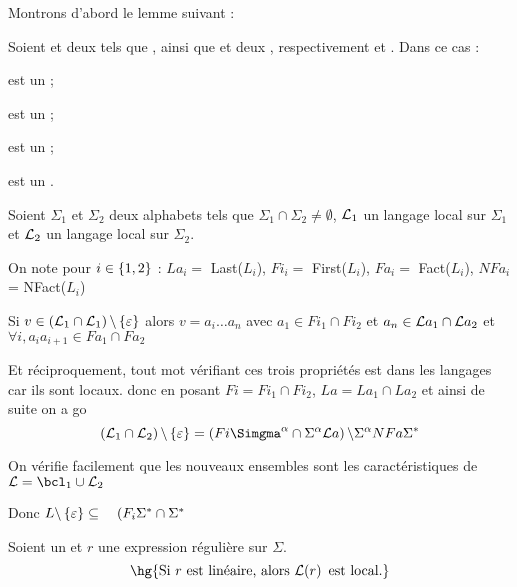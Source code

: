 \documentclass[a4paper,french,bookmarks]{book}
\begin{document}
    Montrons d'abord le lemme suivant :
    \begin{lemma}{}{}
        Soient  et  deux  tels que \hg{$\Sigma_1 \cap \Sigma_2 \neq \emptyset$}, ainsi que  et  deux , respectivement  et . Dans ce cas :
        \begin{enumerate}
            \itast {} est un  ;

            \itast {} est un  ;
            
            \itast {} est un  ;
            
            \itast {} est un .
        \end{enumerate}
    \end{lemma}
    
    \begin{nproof}
        Soient $\Sigma_1$ et $\Sigma_2$ deux alphabets tels que $\Sigma_1 \cap \Sigma_2 \neq \emptyset$, $\mathcal{L}_1$ un langage local sur $\Sigma_1$ et $\mathcal{L}_2$ un langage local sur $\Sigma_2$.
        
        On note pour \(i\in \left\{1, 2\right\}\) : \(La_i =\) Last(\(L_i\)), \(Fi_i =\) First(\(L_i\)), \(Fa_i =\) Fact(\(L_i\)), \(NFa_i\) = NFact(\(L_i\))

        \begin{psse}
            \item Si \(v \in \left(\mathcal{L}_1\cap\mathcal{L}_1\right)\backslash\left\{\varepsilon\right\}\) alors \(v = a_i \hdots a_n\) avec \(a_1 \in Fi_1 \cap Fi_2\) et \(a_n \in \mathcal{L} a_1 \cap \mathcal{L} a_2\) et \(\forall i, a_i a_{i+1} \in Fa_1 \cap Fa_2\)

            Et réciproquement, tout mot vérifiant ces trois propriétés est dans les langages car ils sont locaux. donc en posant \(Fi = Fi_1 \cap Fi_2\), \(La = La_1 \cap La_2\) et ainsi de suite on a go 
            \[ \left(\bcL_1\cap \bcL_2 \right) \backslash \ens{\varepsilon} = \left(Fi\Simgma^{\alpha} \cap \Sigma^{\alpha} \bcL a\right) \backslash \Sigma^{\alpha} NFa \Sigma^*\]

            On vérifie facilement que les nouveaux ensembles sont les caractéristiques de \(\bcL=\bcl_1\cup\bcL_2\)
            
            Donc $L \backslash \left\{\varepsilon\right\} \subseteq \quad (F_i \Sigma^* \cap \Sigma^* $

            
        \end{psse}
    \end{nproof}
    
    
    \begin{property}{}{}
        Soient \hg{$\Sigma$} un  et $r$ une expression régulière sur $\Sigma$.
        \[ \hg{\text{Si} \ r \ \text{est linéaire, alors} \ \bcL\p{r} \ \text{est local.}} \]
    \end{property}
    
    
\end{document}
